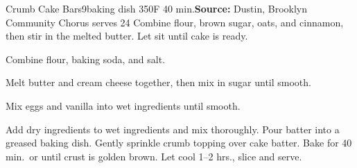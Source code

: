 \begin{recipe}{Crumb Cake Bars}{9\inch{}\inch baking dish \hfill 350\0F \hfill 40 min.}{\textbf{Source:} Dustin, Brooklyn Community Chorus \hfill serves 24}
 Combine flour, brown sugar, oats, and cinnamon, then stir in the melted butter. Let sit until cake is ready.

 Combine flour, baking soda, and salt.

 Melt butter and cream cheese together, then mix in sugar until smooth.

 Mix eggs and vanilla into wet ingredients until smooth.

 \newstep Add dry ingredients to wet ingredients and mix thoroughly. Pour batter into a greased baking dish.
 \newstep Gently sprinkle crumb topping over cake batter. Bake for 40 min.\ or until crust is golden brown. Let cool 1--2 hrs., slice and serve.
\end{recipe}
